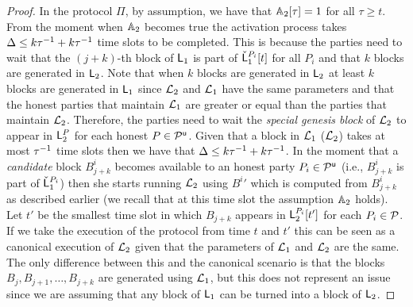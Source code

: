 \begin{proof}
In the protocol $\Pi$, by assumption, we have that $\mathbb{A}_2[\tau]=1$ for all $\tau \geq t$. 
From the moment when $\mathbb{A}_2$ becomes true the activation process takes $\Delta\leq k \tau^{-1} + k \tau^{-1}$  time slots to be completed.
This is because the parties need to wait that the $(j+k)$-th block of $\mathsf{L}_1$ is part of $\check {\mathsf{L}}_1^{P_i}[t]$  for all $P_i$ and that $k$ blocks are generated in $\mathsf{L}_2$. Note that when $k$ blocks are generated in $\mathsf{L}_2$ at least 
$k$ blocks are generated in $\mathsf{L}_1$ since $\mathcal{L}_2$ and $\mathcal{L}_1$ have the same parameters and that the honest parties that maintain $\mathcal{L}_1$ are greater or equal than the parties that maintain $\mathcal{L}_2$. Therefore, the parties need to wait the \emph{special genesis block} of $\mathcal{L}_2$ to appear 
in $\mathsf{L}_2^P$ for each honest $P\in\mathcal{P}^\mathsf{u}$. Given that a block in $\mathcal{L}_1$ ($\mathcal{L}_2$) takes at most $\tau^{-1}$ time slots then we have that $\Delta \leq k \tau^{-1} + k \tau^{-1}$.
In the moment that a \emph{candidate} block $B^i_{j+k}$ becomes available to an honest party $P_i\in\mathcal{P}^\mathsf{u}$ (i.e., $B^i_{j+k}$ is part of $\check {\mathsf{L}}_1^{P_i}$) then she starts running $\mathcal{L}_2$
using ${B^i}'$ which is computed from $B^i_{j+k}$ as described earlier (we recall that at this time slot the assumption $\mathbb{A}_2$ holds).
Let $t'$ be the smallest time slot in which $B_{j+k}$ appears in $\mathsf{L}_2^{P_i}[t']$  for each $P_i\in\mathcal{P}$.
If we take the execution of the protocol from time $t$ and $t'$ this can be seen as a canonical execution of $\mathcal{L}_2$ given
that the parameters of $\mathcal{L}_1$ and $\mathcal{L}_2$ are the same. The only difference between this and the canonical scenario is
that the blocks $B_{j}, B_{j+1},\dots, B_{j+k}$  are generated using $\mathcal{L}_1$, but this does not represent an issue since we are assuming that
any block of $\mathsf{L}_1$ can be turned into a block of $\mathsf{L}_2$. \end{proof}
